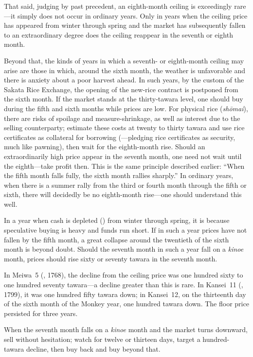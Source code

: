 That said, judging by past precedent, an eighth-month ceiling is
exceedingly rare---it simply does not occur in ordinary years. Only in
years when the ceiling price has appeared from winter through spring and
the market has subsequently fallen to an extraordinary degree does the
ceiling reappear in the seventh or eighth month.

Beyond that, the kinds of years in which a seventh- or eighth-month
ceiling may arise are those in which, around the sixth month, the
weather is unfavorable and there is anxiety about a poor harvest ahead.
In such years, by the custom of the Sakata Rice Exchange, the opening of
the new-rice contract is postponed from the sixth month. If the market
stands at the thirty-tawara level, one should buy during the fifth and
sixth months while prices are low. For physical rice
(\textit{sh\=omai}), there are risks of spoilage and measure-shrinkage,
as well as interest due to the selling counterparty; estimate these
costs at twenty to thirty tawara and use rice certificates as collateral
for borrowing (---pledging rice certificates as
security, much like pawning), then wait for the eighth-month rise.
Should an extraordinarily high price appear in the seventh month, one
need not wait until the eighth---take profit then. This is the same
principle described earlier: ``When the fifth month falls fully, the
sixth month rallies sharply.'' In ordinary years, when there is a summer
rally from the third or fourth month through the fifth or sixth, there
will decidedly be no eighth-month rise---one should understand this
well.


\begin{sokyubox}
{\small\itshape\color{sokyubar} }

\medskip
In a year when cash is depleted () from
winter through spring, it is because speculative buying is heavy and
funds run short. If in such a year prices have not fallen by the fifth
month, a great collapse around the twentieth of the sixth month is
beyond doubt. Should the seventh month in such a year fall on a
\textit{kinoe} month, prices should rise sixty or seventy tawara in the
seventh month.

In Meiwa~5 (, 1768), the decline from the ceiling price
was one hundred sixty to one hundred seventy tawara---a decline greater
than this is rare. In Kansei~11 (, 1799), it was one
hundred fifty tawara down; in Kansei~12, on the thirteenth day of the
sixth month of the Monkey year, one hundred tawara down. The floor price
persisted for three years.

When the seventh month falls on a \textit{kinoe} month and the market
turns downward, sell without hesitation; watch for twelve or thirteen
days, target a hundred-tawara decline, then buy back and buy beyond that.
\end{sokyubox}

